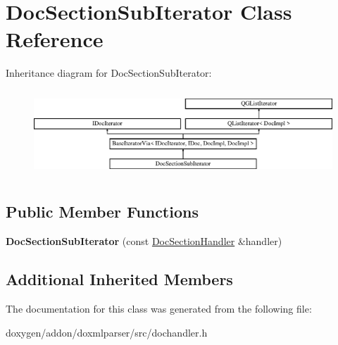 \hypertarget{class_doc_section_sub_iterator}{}\section{Doc\+Section\+Sub\+Iterator Class Reference}
\label{class_doc_section_sub_iterator}
Inheritance diagram for Doc\+Section\+Sub\+Iterator\+:\begin{figure}[H]
\begin{center}
\leavevmode
\includegraphics[height=3.294118cm]{class_doc_section_sub_iterator}
\end{center}
\end{figure}
\subsection*{Public Member Functions}
\begin{DoxyCompactItemize}
\item 
\mbox{\label{class_doc_section_sub_iterator_a9c7e5c638e82ed07016b97a0aaa537f7}} 
{\bfseries Doc\+Section\+Sub\+Iterator} (const \mbox{\hyperlink{class_doc_section_handler}{Doc\+Section\+Handler}} \&handler)
\end{DoxyCompactItemize}
\subsection*{Additional Inherited Members}


The documentation for this class was generated from the following file\+:\begin{DoxyCompactItemize}
\item 
doxygen/addon/doxmlparser/src/dochandler.\+h\end{DoxyCompactItemize}
